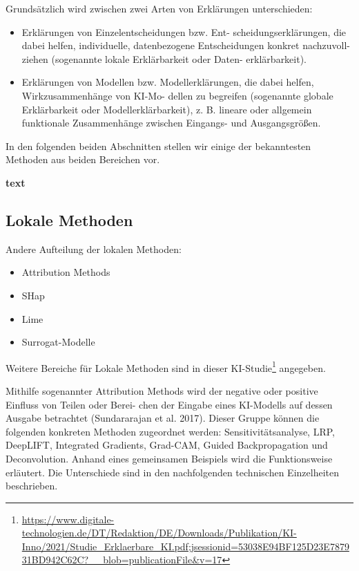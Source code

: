 \documentclass[11pt,a4paper]{article}
\numberwithin{equation}{section}
\begin{document}
	Grundsätzlich wird zwischen zwei Arten von Erklärungen unterschieden:
	
	\begin{itemize}
		\item Erklärungen von Einzelentscheidungen bzw. Ent-
		scheidungserklärungen, die dabei helfen, individuelle,
		datenbezogene Entscheidungen konkret nachzuvoll-
		ziehen (sogenannte lokale Erklärbarkeit oder Daten-
		erklärbarkeit).
		\item Erklärungen von Modellen bzw. Modellerklärungen,
		die dabei helfen, Wirkzusammenhänge von KI-Mo-
		dellen zu begreifen (sogenannte globale Erklärbarkeit
		oder Modellerklärbarkeit), z. B. lineare oder allgemein
		funktionale Zusammenhänge zwischen Eingangs-
		und Ausgangsgrößen.
	\end{itemize}
	
	In den folgenden beiden Abschnitten stellen wir einige der bekanntesten Methoden aus beiden Bereichen vor.
	
	
	\noindent \textbf{text}
	\subsection{Lokale Methoden}
	
	Andere Aufteilung der lokalen Methoden:
	\begin{itemize}
		\item Attribution Methods
		\item SHap
		\item Lime
		\item Surrogat-Modelle	
	\end{itemize}
	
	Weitere Bereiche für Lokale Methoden sind in dieser KI-Studie\footnote{\url{https://www.digitale-technologien.de/DT/Redaktion/DE/Downloads/Publikation/KI-Inno/2021/Studie_Erklaerbare_KI.pdf;jsessionid=53038E94BF125D23E787931BD942C62C?__blob=publicationFile\&v=17}} angegeben.
	
	Mithilfe sogenannter Attribution Methods wird der
	negative oder positive Einfluss von Teilen oder Berei-
	chen der Eingabe eines KI-Modells auf dessen Ausgabe
	betrachtet (Sundararajan et al. 2017). Dieser Gruppe
	können die folgenden konkreten Methoden zugeordnet
	werden: Sensitivitätsanalyse, LRP, DeepLIFT, Integrated
	Gradients, Grad-CAM, Guided Backpropagation und
	Deconvolution. Anhand eines gemeinsamen Beispiels
	wird die Funktionsweise erläutert. Die Unterschiede
	sind in den nachfolgenden technischen Einzelheiten
	beschrieben.
	
\end{document}
